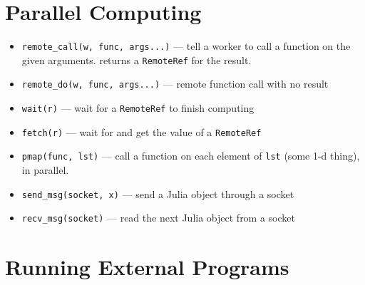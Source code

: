 \documentclass{article}
\begin{document}
\section{Parallel Computing}
\begin{itemize}
   \item \verb|remote_call(w, func, args...)| ---
     tell a worker to call a function on the given arguments.
     returns a \verb|RemoteRef| for the result.

   \item \verb|remote_do(w, func, args...)| ---
     remote function call with no result

   \item \verb|wait(r)| ---
     wait for a \verb|RemoteRef| to finish computing

   \item \verb|fetch(r)| ---
     wait for and get the value of a \verb|RemoteRef|

   \item \verb|pmap(func, lst)| ---
     call a function on each element of \verb|lst| (some 1-d thing), in
     parallel.

   \item \verb|send_msg(socket, x)| ---
     send a Julia object through a socket

   \item \verb|recv_msg(socket)| ---
     read the next Julia object from a socket
\end{itemize}

\section{Running External Programs}
\end{document}
